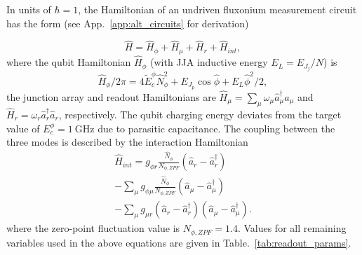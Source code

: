 \documentclass[%
reprint,
superscriptaddress,
 amsmath,amssymb,
 aps,
 prx,
longbibliography,
floatfix,
]{revtex4-2}
\begin{document}
In units of $\hbar=1$, the Hamiltonian of an undriven fluxonium measurement circuit has the form (see App.~\ref{app:alt_circuits} for derivation)

\begin{equation}
   \hat H =\hat{H}_\phi + \hat{H}_\mu + \hat{H}_r + \hat{H}_{int},\label{Hamiltonian_total}
\end{equation}
where the qubit Hamiltonian $\hat{H}_\phi$ (with JJA inductive energy $E_L=E_{J_j}/N$) is 
\begin{equation}
\hat{H}_\phi / 2\pi = 4\tilde{E}^\phi_c \hat N_\phi^2+ E_{J_p}\cos{\hat\phi}+E_L\hat \phi^2 /2,
\end{equation}
the junction array and readout Hamiltonians are $\hat{H}_\mu = \sum_{\mu}\omega_\mu \hat a_\mu^\dagger \hat a_\mu$ and $\hat{H}_r = \omega_r \hat a_r^\dagger \hat a_r$, respectively. The qubit charging energy deviates from the target value of $E_c^{\phi}=1 \ \mathrm{GHz}$ due to parasitic capacitance. The coupling between the three modes is described by the interaction Hamiltonian
\begin{align}\label{eq:int_hamiltonian}
\hat{H}_{int} = g_{\phi r} \frac{\hat N_\phi}{{N_{\phi,ZPF}}} (\hat a_r-\hat a_r^\dagger)\nonumber \\ -\sum_{\mu} g_{\phi\mu} \frac{\hat N_\phi}{{N_{\phi,ZPF}}} (\hat a_\mu-\hat a_\mu^\dagger) \nonumber \\- \sum_{\mu} g_{\mu r} (\hat a_r-\hat a_r^\dagger)(\hat a_\mu-\hat a_\mu^\dagger).
\end{align}
where the zero-point fluctuation value is $N_{\phi,ZPF}=1.4$. Values for all remaining variables used in the above equations are given in Table.~\ref{tab:readout_params}.
\end{document}
